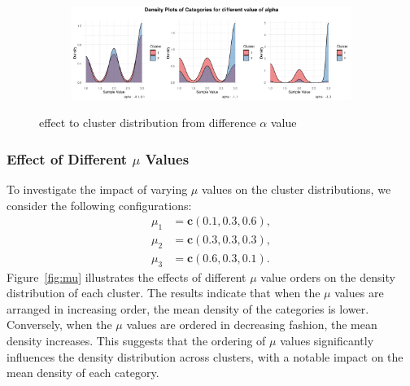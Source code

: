 \documentclass{article}
\begin{document}
\begin{figure}[h]
  \centering
  \begin{subfigure}{1.0\textwidth}
      \centering
      \includegraphics[width=\textwidth]{images/para_sim/alpha.png}
  \end{subfigure}
  \caption{effect to cluster distribution from difference $\alpha$ value}
  \label{fig:alpha}
\end{figure}

\subsubsection*{Effect of Different $\mu$ Values}
To investigate the impact of varying $\mu$ values on the cluster distributions, 
we consider the following configurations:
\[
\begin{aligned}
\mu_1 &= \mathbf{c}(0.1, 0.3, 0.6), \\
\mu_2 &= \mathbf{c}(0.3, 0.3, 0.3), \\
\mu_3 &= \mathbf{c}(0.6, 0.3, 0.1).
\end{aligned}
\]
Figure~\ref{fig:mu} illustrates the effects of different $\mu$ value orders 
on the density distribution of each cluster. 
The results indicate that when the $\mu$ values are arranged in increasing order, 
the mean density of the categories is lower. Conversely, 
when the $\mu$ values are ordered in decreasing fashion, 
the mean density increases. 
This suggests that the ordering of $\mu$ values significantly influences 
the density distribution across clusters, 
with a notable impact on the mean density of each category.
\end{document}
